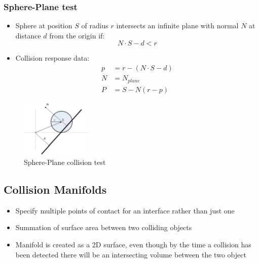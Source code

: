 \documentclass[a4paper]{article}
\begin{document}
\subsubsection{Sphere-Plane test}

\begin{itemize}
  \item
    Sphere at position $S$ of radius $r$ intersects an infinite plane with
    normal $N$ at distance $d$ from the origin if:
    \[
      N \cdot S -d < r
    \]

  \item
    Collision response data:
    \begin{align*}
      p &= r - (N \cdot S - d) \\
      N &= N_{plane} \\
      P &= S - N(r - p)
    \end{align*}

\end{itemize}

\begin{figure}[h!]
  \centering
  \includegraphics[width=0.3\textwidth]{graphics/plane_collision_detection.eps}
  \caption{Sphere-Plane collision test}
  \label{fig:plane_collision_detection}
\end{figure}
\FloatBarrier

\subsection{Collision Manifolds}

\begin{itemize}
  \item
    Specify multiple points of contact for an interface rather than just one

  \item
    Summation of surface area between two colliding objects

  \item
    Manifold is created as a 2D surface, even though by the time a collision has
    been detected there will be an intersecting volume between the two object

\end{itemize}
\end{document}
